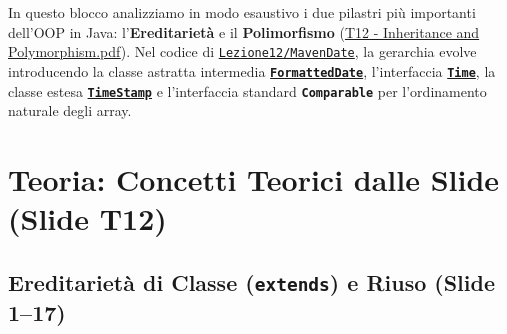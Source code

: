\documentclass[11pt,a4paper,oneside]{report}
\newcommand{\passthrough}[1]{#1}
\begin{document}
In questo blocco analizziamo in modo esaustivo i due pilastri più
importanti dell'OOP in Java: l'\textbf{Ereditarietà} e il
\textbf{Polimorfismo}
(\href{file:///home/wally/Documenti/GitHub/Programmazione-II/25-26/Teoria-e-Esercitazioni/Slides-20260902/T12\%20-\%20Inheritance\%20and\%20Polymorphism.pdf}{T12
- Inheritance and Polymorphism.pdf}). Nel codice di
\href{file:///home/wally/Documenti/GitHub/Programmazione-II/25-26/Teoria-e-Esercitazioni/Codice-20260902/Lezione12/MavenDate}{\passthrough{\lstinline!Lezione12/MavenDate!}},
la gerarchia evolve introducendo la classe astratta intermedia
\textbf{\href{file:///home/wally/Documenti/GitHub/Programmazione-II/25-26/Teoria-e-Esercitazioni/Codice-20260902/Lezione12/MavenDate/src/main/java/it/oop/core/FormattedDate.java}{\passthrough{\lstinline!FormattedDate!}}},
l'interfaccia
\textbf{\href{file:///home/wally/Documenti/GitHub/Programmazione-II/25-26/Teoria-e-Esercitazioni/Codice-20260902/Lezione12/MavenDate/src/main/java/it/oop/core/Time.java}{\passthrough{\lstinline!Time!}}},
la classe estesa
\textbf{\href{file:///home/wally/Documenti/GitHub/Programmazione-II/25-26/Teoria-e-Esercitazioni/Codice-20260902/Lezione12/MavenDate/src/main/java/it/oop/core/TimeStamp.java}{\passthrough{\lstinline!TimeStamp!}}}
e l'interfaccia standard \textbf{\passthrough{\lstinline!Comparable!}}
per l'ordinamento naturale degli array.

\section{Teoria: Concetti Teorici dalle Slide (Slide
T12)}\label{chap11_teoria-concetti-teorici-dalle-slide-slide-t12}

\subsection{\texorpdfstring{Ereditarietà di Classe (\texttt{extends}) e
Riuso (Slide
1--17)}{Ereditarietà di Classe (extends) e Riuso (Slide 1--17)}}\label{chap11_ereditarietuxe0-di-classe-extends-e-riuso-slide-117}
\end{document}
